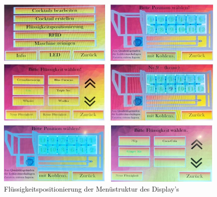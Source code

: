 \begin{figure}[H]
	\centering
	\includegraphics[width=\textwidth]{graphics/DisplayPositionierung1}
	\caption{Flüssigkeitspositionierung der Menüstruktur des Display's}
	\label{fig:DisplayPositionierung1}
\end{figure}


